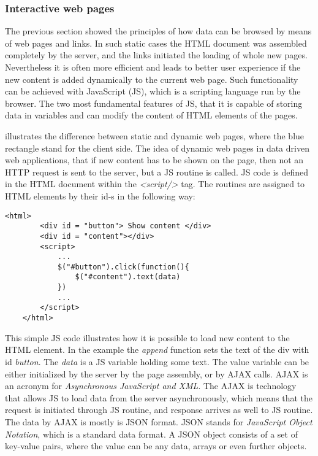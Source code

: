 \subsubsection{Interactive web pages}

The previous section showed the principles of how data can be browsed by means of web pages and links. In such static cases the HTML document was assembled completely by the server, and the links initiated the loading of whole new pages. Nevertheless it is often more efficient and leads to better user experience if the new content is added dynamically to the current web page. Such functionality can be achieved with JavaScript (JS), which is a scripting language run by the browser. The two most fundamental features of JS, that it is capable of storing data in variables and can modify the content of HTML elements of the pages. 


 illustrates the difference between static and dynamic web pages, where the blue rectangle stand for the client side. The idea of dynamic web pages in data driven web applications, that if new content has to be shown on the page, then not an HTTP request is sent to the server, but a JS routine is called. JS code is defined in the HTML document within the \textit{<script/>} tag. The routines are assigned to HTML elements by their id-s in the following way:

\begin{lstlisting}[captionpos=b, caption=JavaScript routine assigned to an HTML element, label=jsListing, belowskip=1em, aboveskip=2em,
basicstyle=\footnotesize,frame=single]
	<html>
		<div id = "button"> Show content </div>
		<div id = "content"></div>
		<script>
			...
			$("#button").click(function(){
				$("#content").text(data)
			})
			...	
		</script>
	</html>
\end{lstlisting}


This simple JS code illustrates how it is possible to load new content to the HTML element. In the example the \textit{append} function sets the text of the div with id \textit{button}. The \textit{data} is a JS variable holding
some text. The value variable can be either initialized by the server by the page assembly, or by AJAX calls. AJAX is an acronym for \textit{Asynchronous JavaScript and XML}. The AJAX is technology that allows JS to load data from the server asynchronously, which means that the request is initiated through JS routine, and response arrives as well to JS routine. The data by AJAX is mostly is JSON format. JSON stands for \textit{JavaScript Object Notation}, which is a standard data format. A JSON object consists of a set of key-value pairs, where the value can be any data, arrays or even further objects.

